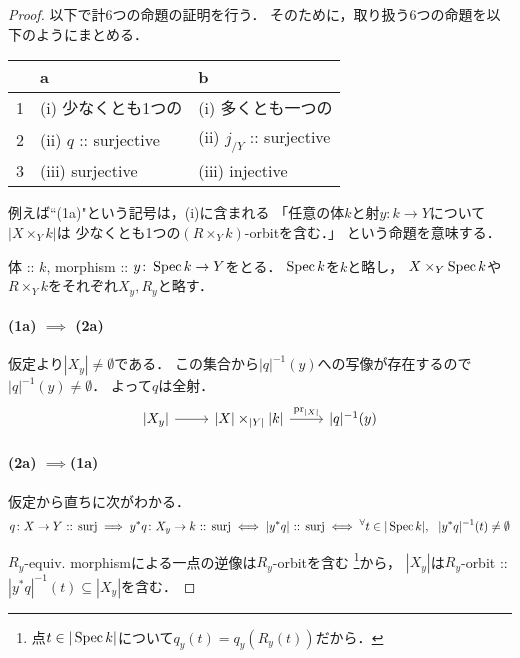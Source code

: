 \begin{proof}
    以下で計$6$つの命題の証明を行う．
    そのために，取り扱う$6$つの命題を以下のようにまとめる．
    \begin{center}
    \begin{tabular}{|l|l|l|}
    \hline
          & a                       & b                             \\ \hline
        1 & (i) 少なくとも1つの     & (i) 多くとも一つの            \\ \hline
        2 & (ii) $q$ :: surjective  & (ii) $j_{/Y}$ :: surjective   \\ \hline
        3 & (iii) surjective        & (iii) injective               \\ \hline
    \end{tabular}
    \end{center}
    例えば``(1a)"という記号は，(i)に含まれる
    「任意の体$k$と射$y \colon k \to Y$について$|X \times_{Y} k|$は
        少なくとも1つの$(R \times_{Y} k)$-orbitを含む．」
    という命題を意味する．

    体 :: $k$, morphism :: $y \colon \operatorname{Spec} k \to Y$をとる．
    $\operatorname{Spec} k$を$k$と略し，
    $X \times_{Y} \operatorname{Spec} k$や$R \times_{Y} k$をそれぞれ$X_y, R_y$と略す．

    \paragraph{(1a) $\implies$ (2a)}
    仮定より$|X_y| \neq \emptyset$である．
    この集合から$|q|^{-1}(y)$への写像が存在するので$|q|^{-1}(y) \neq \emptyset$．
    よって$q$は全射．
    \[
    \begin{tikzcd}[]
        \vert X_y \vert \ar[r]&
        \vert X \vert \times_{\vert Y \vert} \vert k \vert \ar[r, "\pr_{\vert X \vert}"]&
        \vert q \vert^{-1}(y)
    \end{tikzcd}
    \]

    \paragraph{(2a) $\implies$(1a)}
    仮定から直ちに次がわかる．
    \[
                 q \colon X \to Y \text{ :: surj}
        \implies y^*q \colon X_y \to k \text{ :: surj}
        \iff     |y^*q| \text{ :: surj}
        \iff     {}^{\forall} t \in |\operatorname{Spec} k|,~~|y^*q|^{-1}(t) \neq \emptyset
    \]

    $R_y$-equiv. morphismによる一点の逆像は$R_y$-orbitを含む
        \footnote{ 点$t \in |\operatorname{Spec} k|$について$q_y(t)=q_y(R_y(t))$だから． }から，
    $|X_y|$は$R_y$-orbit :: $|y^*q|^{-1}(t) \subseteq |X_y|$を含む．


\end{proof}
